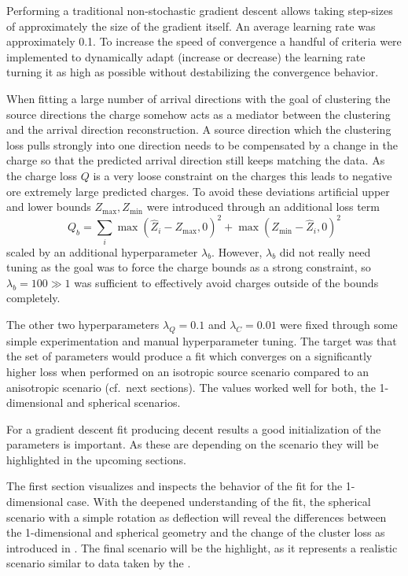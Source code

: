 Performing a traditional non-stochastic gradient descent allows taking step-sizes of approximately the size of the gradient itself. An average learning rate was approximately 0.1. To increase the speed of convergence a handful of criteria were implemented to dynamically adapt (increase or decrease) the learning rate turning it as high as possible without destabilizing the convergence behavior.

When fitting a large number of arrival directions with the goal of clustering the source directions the charge somehow acts as a mediator between the clustering and the arrival direction reconstruction. A source direction which the clustering loss pulls strongly into one direction needs to be compensated by a change in the charge so that the predicted arrival direction still keeps matching the data. As the charge loss \(Q\) is a very loose constraint on the charges this leads to negative ore extremely large predicted charges. To avoid these deviations artificial upper and lower bounds \(Z_{\max}, Z_{\min}\) were introduced through an additional loss term
\begin{equation}
    Q_b = \sum_i {\max(\hat Z_i - Z_{\max}, 0)}^2 + {\max(Z_{\min} - \hat Z_i, 0)}^2
\end{equation}
scaled by an additional hyperparameter \(\lambda_b\). However, \(\lambda_b\) did not really need tuning as the goal was to force the charge bounds as a strong constraint, so \(\lambda_b=100 \gg 1\) was sufficient to effectively avoid charges outside of the bounds completely.

The other two hyperparameters \(\lambda_Q=0.1\) and \(\lambda_C=0.01\) were fixed through some simple experimentation and manual hyperparameter tuning. The target was that the set of parameters would produce a fit which converges on a significantly higher loss when performed on an isotropic source scenario compared to an anisotropic scenario (cf.\ next sections). The values worked well for both, the 1-dimensional and spherical scenarios.

For a gradient descent fit producing decent results a good initialization of the parameters is important. As these are depending on the scenario they will be highlighted in the upcoming sections.


The first section visualizes and inspects the behavior of the fit for the 1-dimensional case. With the deepened understanding of the fit, the spherical scenario with a simple rotation as deflection will reveal the differences between the 1-dimensional and spherical geometry and the change of the cluster loss as introduced in . The final scenario will be the highlight, as it represents a realistic scenario similar to data taken by the \pao{}.

